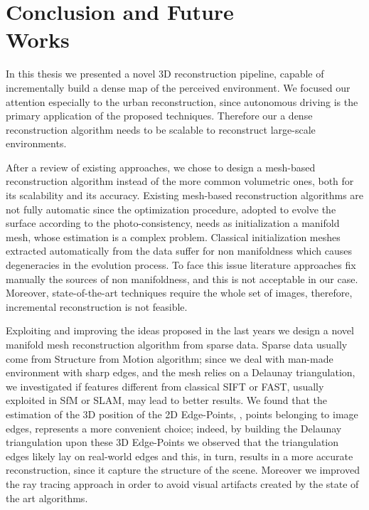 \chapter[Conclusion and Future Works]{Conclusion and Future \\Works}
\label{ch:future_works}
In this thesis we presented a novel 3D reconstruction pipeline, capable of incrementally build a dense map of the perceived environment.
We focused our attention especially to the urban reconstruction, since autonomous driving is the primary application of the proposed techniques.
Therefore our a dense reconstruction algorithm needs to be scalable  to reconstruct large-scale environments.


After a review of existing approaches, we chose to design a mesh-based reconstruction algorithm instead of the more common volumetric ones, both for its scalability and its accuracy. 
Existing mesh-based reconstruction algorithms are not fully automatic since the optimization procedure, adopted to evolve the surface according to the photo-consistency, needs as initialization a manifold mesh, whose estimation is a complex problem. 
Classical initialization meshes extracted automatically from the data suffer for non manifoldness which causes degeneracies in the evolution process. 
To face this issue literature approaches fix manually the sources of non manifoldness, and this is not acceptable in our case. 
Moreover, state-of-the-art techniques require the whole set of images, therefore, incremental reconstruction is not feasible.

Exploiting and improving the ideas proposed in the last years we design a novel manifold mesh reconstruction algorithm from sparse data. 
Sparse data usually come from Structure from Motion algorithm; since we deal with man-made environment with sharp edges, and the mesh relies on a Delaunay triangulation, we investigated if features different from classical SIFT or FAST, usually exploited in SfM or SLAM, may lead to better results. 
We found that the estimation of the 3D position of the 2D Edge-Points, \ie, points belonging to image edges, represents a more convenient choice; indeed, by building the Delaunay triangulation upon these 3D Edge-Points we observed that the triangulation edges likely lay on real-world edges and this, in turn, results in a more accurate reconstruction, since it capture the structure of the scene. 
Moreover we improved the ray tracing approach in order to avoid visual artifacts created by the state of the art algorithms.

